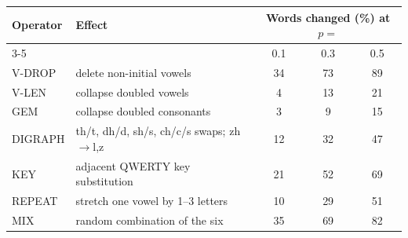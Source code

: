 \begin{tabular}{llccc}
\toprule
Operator & Effect & \multicolumn{3}{c}{Words changed (\%) at $p=$} \\
\cmidrule(lr){3-5}
 & & 0.1 & 0.3 & 0.5 \\
\midrule
V-DROP & delete non-initial vowels & 34 & 73 & 89 \\
V-LEN & collapse doubled vowels & 4 & 13 & 21 \\
GEM & collapse doubled consonants & 3 & 9 & 15 \\
DIGRAPH & th/t, dh/d, sh/s, ch/c/s swaps; zh$\to$l,z & 12 & 32 & 47 \\
KEY & adjacent QWERTY key substitution & 21 & 52 & 69 \\
REPEAT & stretch one vowel by 1--3 letters & 10 & 29 & 51 \\
MIX & random combination of the six & 35 & 69 & 82 \\
\bottomrule
\end{tabular}